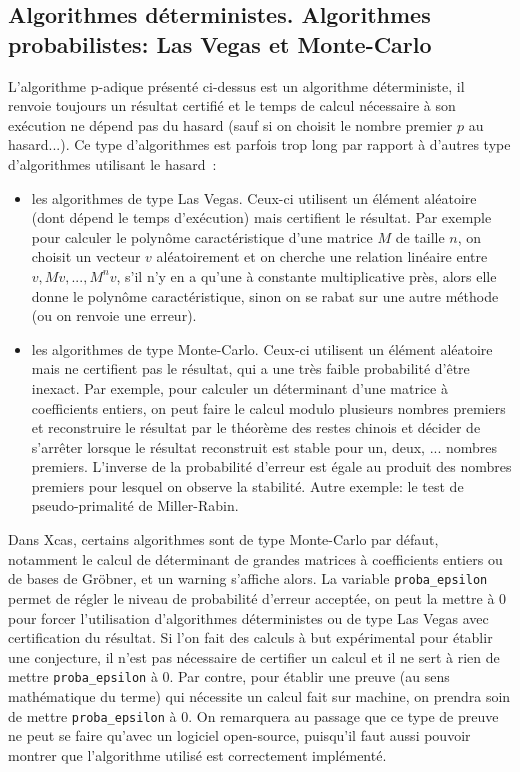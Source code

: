 \documentclass[a4paper,11pt]{book}
\begin{document}
\begin{giacjshere}
\subsection{Algorithmes d\'eterministes. Algorithmes probabilistes: Las Vegas
et Monte-Carlo}
L'algorithme p-adique pr\'esent\'e ci-dessus est un algorithme
d\'eterministe, il renvoie toujours un r\'esultat certifi\'e et 
le temps de calcul n\'ecessaire \`a son ex\'ecution ne d\'epend
pas du hasard (sauf si on choisit le nombre premier $p$ au hasard...).
Ce type d'algorithmes est parfois trop long par rapport 
\`a d'autres type d'algorithmes utilisant le hasard~:
\begin{itemize}
\item les algorithmes de type Las Vegas. Ceux-ci utilisent un 
\'el\'ement al\'eatoire (dont d\'epend le temps d'ex\'ecution) mais
certifient le r\'esultat. Par exemple pour calculer le polyn\^ome
caract\'eristique d'une matrice $M$ de taille $n$, on choisit 
un vecteur $v$ al\'eatoirement
et on cherche une relation lin\'eaire entre $v,Mv,...,M^nv$,
s'il n'y en a qu'une \`a constante multiplicative pr\`es, alors
elle donne le polyn\^ome caract\'eristique, sinon on se rabat
sur une autre m\'ethode (ou on renvoie une erreur).
\item les algorithmes de type Monte-Carlo. Ceux-ci utilisent un
\'el\'ement al\'eatoire mais ne certifient pas le r\'esultat, qui a
une tr\`es faible probabilit\'e d'\^etre inexact. Par exemple,
pour calculer un d\'eterminant d'une matrice \`a coefficients
entiers, on peut faire le calcul modulo plusieurs nombres
premiers et reconstruire le r\'esultat par le th\'eor\`eme
des restes chinois et d\'ecider de s'arr\^eter lorsque
le r\'esultat reconstruit est stable pour un, deux, ... nombres
premiers. L'inverse de la probabilit\'e d'erreur est \'egale
au produit des nombres premiers pour lesquel on observe la
stabilit\'e. Autre exemple: le test de pseudo-primalit\'e
de Miller-Rabin.
\end{itemize}
Dans Xcas, certains algorithmes sont de type Monte-Carlo par
d\'efaut, notamment le calcul de d\'eterminant de grandes matrices
\`a coefficients entiers ou de bases de Gr\"obner, et un warning
s'affiche alors. La variable
\verb|proba_epsilon| permet de r\'egler le niveau de probabilit\'e
d'erreur accept\'ee, on peut la mettre \`a 0 pour forcer l'utilisation
d'algorithmes d\'eterministes ou de type Las Vegas avec certification
du r\'esultat. Si l'on fait des calculs \`a but exp\'erimental pour
\'etablir une conjecture, il n'est pas n\'ecessaire de certifier un
calcul et il ne sert \`a rien de mettre \verb|proba_epsilon| \`a 0.
Par contre, pour \'etablir une preuve (au sens math\'ematique du terme) qui
n\'ecessite un calcul fait sur machine,
on prendra soin de mettre \verb|proba_epsilon| \`a 0. 
On remarquera au passage que ce type de
preuve ne peut se faire qu'avec un logiciel open-source, puisqu'il
faut aussi pouvoir montrer que l'algorithme utilis\'e
est correctement impl\'ement\'e.


\end{giacjshere}
\end{document}
